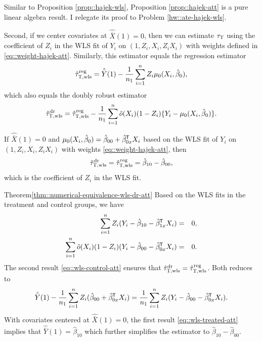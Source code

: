 Similar to Proposition \ref{prop::hajek-wls}, Proposition \ref{prop::hajek-att} is a pure linear algebra result. I relegate its proof to Problem \ref{hw::ate-hajek-wls}. 


Second, if we center covariates at $\hat{\bar{X}}(1) = 0$, then we can estimate $\tau_\textsc{T}$ using the coefficient of $Z_i$ in the WLS fit of $Y_i$ on $(1,Z_i, X_i, Z_iX_i)$ with weights defined in \eqref{eq::weight-hajek-att}. Similarly, this estimator equals the regression estimator 
$$
\hat{\tau}_{\textsc{T},\text{wls}}^\text{reg} = \hat{\bar{Y}}(1) - \frac{1}{n_1} \sum_{i=1}^n Z_i \mu_0(X_i, \hat{\beta}_0),
$$
which also equals the doubly robust estimator
$$
\hat{\tau}_{\textsc{T},\text{wls}}^\text{dr} =\hat{\tau}_{\textsc{T},\text{wls}}^\text{reg} 
- \frac{1}{n_1} \sum_{i=1}^n  \hat{o}(X_i)  (1-Z_i) \{  Y_i- \mu_0(X_i, \hat{\beta}_0) \} .
$$

\begin{theorem}
\label{thm::numerical-equivalence-wls-dr-att}
If $\hat{\bar{X}}(1) = 0$ and $ \mu_0(X_i, \hat{\beta}_0) =  \hat \beta_{00} +   \hat\beta_{0x}^{\mkern-1.5mu\mathsf{T}} X_i$ based on the WLS fit of $Y_i$ on $(1,Z_i, X_i, Z_iX_i)$ with  weights \eqref{eq::weight-hajek-att}, then
$$
\hat{\tau}_{\textsc{T},\textup{wls}}^\textup{dr}  = \hat{\tau}_{\textsc{T},\textup{wls}}^\textup{reg} 
= \hat \beta_{10} - \hat \beta_{00} ,
$$
which is the coefficient of $Z_i$ in the WLS fit. 
\end{theorem}


\begin{myproof}{Theorem}{\ref{thm::numerical-equivalence-wls-dr-att}}
Based on the WLS fits in the treatment and control groups, we have
\begin{eqnarray}
\label{eq::wls-treated-att}
\sumn Z_i ( Y_i -  \hat \beta_{10} -  \hat \beta_{1x}\tran X_i ) &=& 0 ,\\
\label{eq::wls-control-att}
 \sumn \hat{o}(X_i)  (1-Z_i) ( Y_i - \hat \beta_{00} - \hat\beta_{0x}\tran X_i ) &=& 0.
\end{eqnarray}
The second result \eqref{eq::wls-control-att}  ensures that $\hat{\tau}_{\textsc{T},\text{wls}}^\text{dr}  = \hat{\tau}_{\textsc{T},\text{wls}}^\text{reg} $. Both reduces to 
$$
 \hat{\bar{Y}}(1) 
-  \frac{1}{n_1} \sum_{i=1}^n Z_i   (\hat \beta_{00} +   \hat\beta_{0x}^{\mkern-1.5mu\mathsf{T}} X_i)
= \frac{1}{n_1} \sum_{i=1}^n  Z_i(Y_i - \hat \beta_{00} - \hat\beta_{0x}^{\mkern-1.5mu\mathsf{T}} X_i) .
$$
With covariates centered at $\hat{\bar{X}}(1) = 0$, the first result \eqref{eq::wls-treated-att} implies that $\hat{\bar{Y}}(1)  =  \hat \beta_{10} $ which further simplifies the estimator to $ \hat \beta_{10} - \hat \beta_{00}$. 
\end{myproof}






